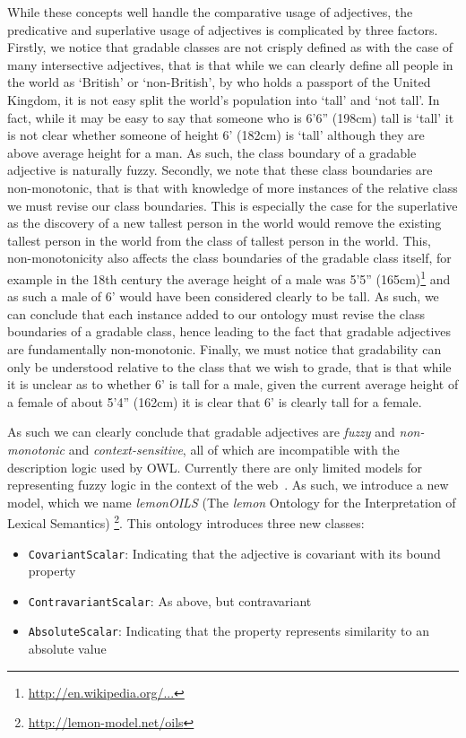 \documentclass[11pt]{article}
\begin{document}
While these concepts well handle the comparative usage of adjectives, the 
predicative and superlative usage of adjectives is complicated by three factors. 
Firstly, we notice that gradable classes are not 
crisply defined as with the case of many intersective adjectives, that is that 
while we can clearly define all people in the world as `British' or 
`non-British', by who holds a passport of the United Kingdom, it is not easy 
split the world's population into `tall' and `not tall'. In fact, while it may 
be easy to say that someone who is 6'6'' (198cm) tall is `tall' it is not clear 
whether someone of height 6' (182cm) is `tall' although they are above average 
height for a man. As such, the class boundary of a gradable adjective is 
naturally fuzzy. Secondly, we note that these class boundaries are 
non-monotonic, that is that with knowledge of more instances of the relative 
class we must revise our class boundaries. This is especially the case for the
superlative as the discovery of a new tallest person in the world would remove 
the existing tallest person in the world from the class of tallest person in the 
world. This, non-monotonicity also affects the class boundaries of the gradable 
class itself, for example in the 18th century the average height of a male was 
5'5'' (165cm)\footnote{\url{http://en.wikipedia.org/...}}
and as such a male of 6' would have been considered clearly to be 
tall. As such, we can conclude that each instance added to our ontology must 
revise the class boundaries of a gradable class, hence leading to the fact that 
gradable adjectives are fundamentally non-monotonic. Finally, we must notice 
that gradability can only be understood relative to the class that we wish to 
grade, that is that while it is unclear as to whether 6' is tall for a male, 
given the current average height of a female of about 5'4'' (162cm) it is clear 
that 6' is clearly tall for a female.

As such we can clearly conclude that gradable adjectives are \emph{fuzzy} and
\emph{non-monotonic} and \emph{context-sensitive}, all of which are incompatible 
with the description logic
used by OWL. Currently there are only limited models for representing fuzzy 
logic in the context of the web~\cite{zhao2008uncertainty}. As such, we 
introduce a new model, which we name \emph{lemonOILS} (The \emph{lemon} 
Ontology for the Interpretation of Lexical Semantics)
\footnote{\url{http://lemon-model.net/oils}}. This ontology introduces three 
new classes:

\begin{itemize}
	\item {\tt CovariantScalar}: Indicating that the adjective is covariant with its bound property
	\item {\tt ContravariantScalar}: As above, but contravariant
	\item {\tt AbsoluteScalar}: Indicating that the property represents similarity to an absolute value
\end{itemize}
\end{document}

